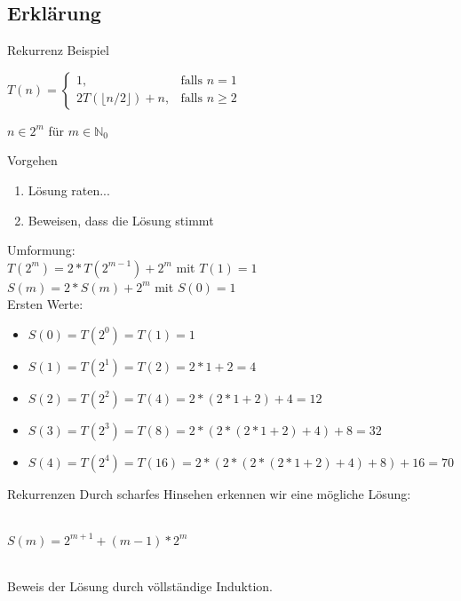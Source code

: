 \documentclass[18pt]{beamer}
\begin{document}
\subsection{Erklärung}
	\begin{frame}{Rekurrenz Beispiel}
		\begin{center}
			$ T(n)=\left\{\begin{array}{cr} 1, & \mbox{falls } n = 1\\ 2 T(\lfloor n / 2 \rfloor) + n, & \mbox{falls } n \geq 2 \end{array}\right. $

			\parskip 14pt
			$n \in 2 ^{m} $ für $ m \in \mathbb{N} _{0} $

		\end{center}
		\begin{block}{Vorgehen}
			\begin{enumerate}
				\item Lösung raten...
				\item Beweisen, dass die Lösung stimmt
			\end{enumerate}
		\end{block}

	\end{frame}
	
	\begin{frame}
		Umformung: \\
		$T(2^m) = 2* T(2^{m - 1}) + 2^m$ mit $T(1) = 1$\\
		$S(m) = 2 * S(m) + 2^m$ mit $S(0) = 1$ \\
		\parskip 12pt
		Ersten Werte:
		\begin{itemize}
			\item $S(0) = T(2^0) = T(1) = 1$
			\item $S(1) = T(2^1) = T(2) = 2 * 1 + 2 = 4$
			\item $S(2) = T(2^2) = T(4) = 2 * (2 * 1 + 2) + 4 = 12$
			\item $S(3) = T(2^3) = T(8) = 2 * (2 * (2 * 1 + 2) + 4 ) + 8 = 32$
			\item $S(4) = T(2^4) = T(16) = 2 * ( 2 * (2 * (2 * 1 + 2) + 4 ) + 8 ) + 16 = 70$
		\end{itemize}
	\end{frame}

	\begin{frame}{Rekurrenzen}
		Durch scharfes Hinsehen erkennen wir eine mögliche Lösung: \\
		\ \\
		\centerline{\large{$S(m) = 2^{m+1} + (m-1) * 2^{m}$}}
		\ \\
		Beweis der Lösung durch völlständige Induktion.
	\end{frame}
\end{document}
